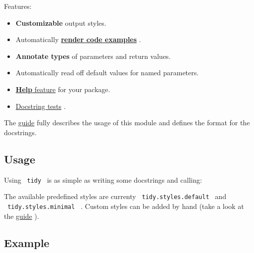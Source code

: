 Features:

\begin{itemize}
\tightlist
\item
  \textbf{Customizable} output styles.
\item
  Automatically
  \href{https://github.com/typst/packages/raw/main/packages/preview/tidy/0.3.0/\#example}{\textbf{render
  code examples}} .
\item
  \textbf{Annotate types} of parameters and return values.
\item
  Automatically read off default values for named parameters.
\item
  \href{https://github.com/typst/packages/raw/main/packages/preview/tidy/0.3.0/\#generate-a-help-command-for-you-package}{\textbf{Help}
  feature} for your package.
\item
  \href{https://github.com/typst/packages/raw/main/packages/preview/tidy/0.3.0/\#docstring-tests}{Docstring
  tests} .
\end{itemize}

The
\href{https://github.com/Mc-Zen/tidy/releases/download/v0.3.0/tidy-guide.pdf}{guide}
fully describes the usage of this module and defines the format for the
docstrings.

\subsection{Usage}\label{usage}

Using \texttt{\ tidy\ } is as simple as writing some docstrings and
calling:

\begin{Shaded}
\begin{Highlighting}[]

\end{Highlighting}
\end{Shaded}

The available predefined styles are currenty
\texttt{\ tidy.styles.default\ } and \texttt{\ tidy.styles.minimal\ } .
Custom styles can be added by hand (take a look at the
\href{https://github.com/Mc-Zen/tidy/releases/download/v0.3.0/tidy-guide.pdf}{guide}
).

\subsection{Example}\label{example}

